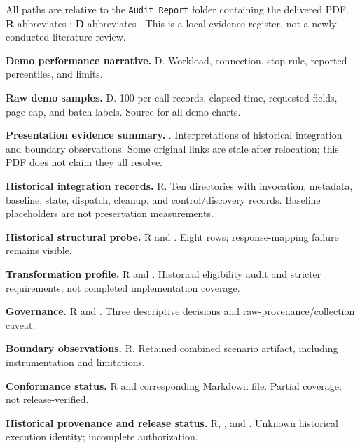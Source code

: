 All paths are relative to the \texttt{Audit Report} folder containing the delivered PDF. \textbf{R} abbreviates ; \textbf{D} abbreviates . This is a local evidence register, not a newly conducted literature review.

\begingroup\small
\begin{description}[leftmargin=10mm,labelwidth=8mm,itemsep=7pt]
\item[S1] \textbf{Demo performance narrative.} D. Workload, connection, stop rule, reported percentiles, and limits.
\item[S2] \textbf{Raw demo samples.} D. 100 per-call records, elapsed time, requested fields, page cap, and batch labels. Source for all demo charts.
\item[S3] \textbf{Presentation evidence summary.} . Interpretations of historical integration and boundary observations. Some original links are stale after relocation; this PDF does not claim they all resolve.
\item[S4] \textbf{Historical integration records.} R. Ten directories with invocation, metadata, baseline, state, dispatch, cleanup, and control/discovery records. Baseline placeholders are not preservation measurements.
\item[S5] \textbf{Historical structural probe.} R and . Eight rows; response-mapping failure remains visible.
\item[S6] \textbf{Transformation profile.} R and . Historical eligibility audit and stricter requirements; not completed implementation coverage.
\item[S7] \textbf{Governance.} R and . Three descriptive decisions and raw-provenance/collection caveat.
\item[S8] \textbf{Boundary observations.} R. Retained combined scenario artifact, including instrumentation and limitations.
\item[S9] \textbf{Conformance status.} R and corresponding Markdown file. Partial coverage; not release-verified.
\item[S10] \textbf{Historical provenance and release status.} R, , and . Unknown historical execution identity; incomplete authorization.

\end{description}
